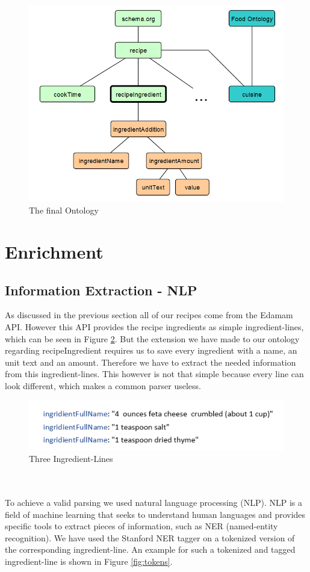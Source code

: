 \documentclass{article}
\begin{document}
\begin{figure}[H]
  \centering
  \includegraphics[width=12cm]{pictures/ontology.png}
  \caption{The final Ontology}
  \label{fig:ontology}
\end{figure}
\noindent

\section{Enrichment}
\subsection{Information Extraction - NLP}
As discussed in the previous section all of our recipes come from the Edamam API. However this API provides the recipe ingredients as simple ingredient-lines, which can be seen in Figure \ref{fig:ingredientLines}. But the extension we have made to our ontology regarding recipeIngredient requires us to save every ingredient with a name, an unit text and an amount. Therefore  we have to extract the needed information from this ingredient-lines. This however is not that simple because every line can look different, which makes a common parser useless. 

\begin{figure}[H]
  \centering
  \includegraphics[width=12cm]{pictures/ingredientLines.png}
  \caption{Three Ingredient-Lines}
  \label{fig:ingredientLines}
\end{figure}
\noindent
\\ \\
To achieve a valid parsing we used natural language processing (NLP). NLP is a field of machine learning that seeks to understand human languages and provides specific tools to extract pieces of information, such as NER (named-entity recognition). We have used the Stanford NER tagger on a tokenized version of the corresponding ingredient-line. An example for such a tokenized and tagged ingredient-line is shown in Figure \ref{fig:tokens}. 
\end{document}
